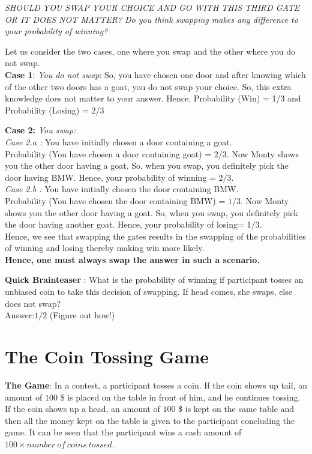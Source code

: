 \documentclass{llncs}
\begin{document}
\textit{SHOULD YOU SWAP YOUR CHOICE AND GO WITH THIS THIRD GATE OR IT DOES NOT MATTER? Do you think swapping makes any difference to your probability of winning?}

Let us consider the two cases, one where you swap and the other where you do not swap. \\

\textbf{Case 1}:\textit{ You do not swap}: So, you have chosen one door and after knowing which of the other two doors has a goat, you do not swap your choice. So, this extra knowledge does not matter to your answer.
Hence, Probability (Win) = 1/3 and Probability (Losing) = 2/3

\textbf{Case 2:} \textit{You swap:}\\ 
\textit{Case 2.a :} You have initially chosen a door containing a goat.\\ 
Probability (You have chosen a door containing goat) = $2/3$. Now Monty shows you the other door having a goat. So, when you swap, you definitely pick the door having BMW. Hence, your probability of winning = $2/3$.\\

\textit{Case 2.b : }You have initially chosen the door containing BMW.\\ 
Probability (You have chosen the door containing BMW) = $1/3$. Now Monty shows you the other door having a goat. So, when you swap, you definitely pick the door having another goat. Hence, your probability of losing= $1/3$.\\

Hence, we see that swapping the gates results in the swapping of the probabilities of winning and losing thereby making win more likely. \\

\textbf{Hence, one must always swap the answer in such a scenario.} 

\textbf{Quick Brainteaser} : What is the probability of winning if participant tosses an unbiased coin to take this decision of swapping. If head comes, she swaps, else does not swap? \\
Answer:$1/2$ (Figure out how!)\\


\section{The Coin Tossing Game}
\textbf{The Game}: In a contest, a participant tosses a coin. If the coin shows up tail, an amount of $100$ \$ is placed on the table in front of him, and he continues tossing. If the coin shows up a head, an amount of $100$ \$ is kept on the same table and then all the money kept on the table is given to the participant concluding the game. It can be seen that the participant wins a cash amount of $100 \times number\ of\ coins\ tossed$. \\
\end{document}
